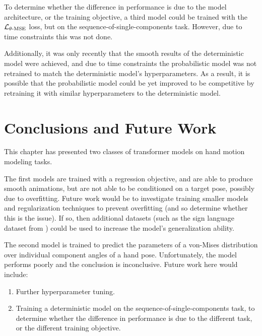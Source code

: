 To determine whether the difference in performance is due to the model architecture, or the training objective, a third model could be trained with the $\mathcal{L}_{\theta\text{-MSE}}$ loss, but on the sequence-of-single-components task. However, due to time constraints this was not done.

Additionally, it was only recently that the smooth results of the deterministic model were achieved, and due to time constraints the probabilistic model was not retrained to match the deterministic model's hyperparameters. As a result, it is possible that the probabilistic model could be yet improved to be competitive by retraining it with similar hyperparameters to the deterministic model.


\section{Conclusions and Future Work}

This chapter has presented two classes of transformer models on hand motion modeling tasks.

The first models are trained with a regression objective, and are able to produce smooth animations, but are not able to be conditioned on a target pose, possibly due to overfitting. Future work would be to investigate training smaller models and regularization techniques to prevent overfitting (and so determine whether this is the issue). If so, then additional datasets (such as the sign language dataset from \cite{signbert}) could be used to increase the model's generalization ability.

The second model is trained to predict the parameters of a von-Mises distribution over individual component angles of a hand pose. Unfortunately, the model performs poorly and the conclusion is inconclusive. Future work here would include:
\begin{enumerate}
    \item Further hyperparameter tuning.
    \item Training a deterministic model on the sequence-of-single-components task, to determine whether the difference in performance is due to the different task, or the different training objective.
\end{enumerate}
